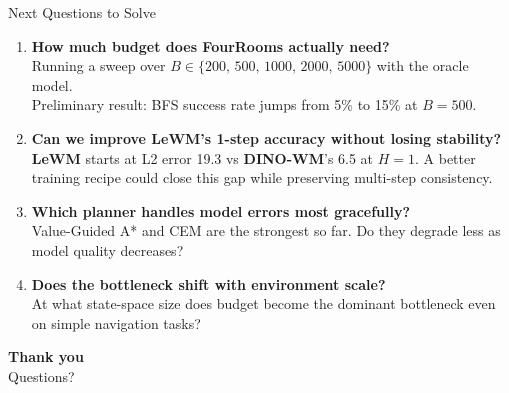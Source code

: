 \documentclass[aspectratio=169, 11pt]{beamer}
\newcommand{\lewm}{\textcolor{LeWMc}{\textbf{LeWM}}\xspace}
\newcommand{\dino}{\textcolor{DINOc}{\textbf{DINO-WM}}\xspace}
\begin{document}
\begin{frame}{Next Questions to Solve}

  \begin{enumerate}
    \setlength\itemsep{1.1em}

    \item \textbf{How much budget does FourRooms actually need?}\\
    {\small Running a sweep over $B \in \{200,\, 500,\, 1000,\, 2000,\, 5000\}$ with the oracle model.\\
    Preliminary result: BFS success rate jumps from 5\% to 15\% at $B = 500$.}

    \item \textbf{Can we improve \lewm's 1-step accuracy without losing stability?}\\
    {\small \lewm starts at L2 error 19.3 vs \dino's 6.5 at $H=1$. A better training recipe could close this gap while preserving multi-step consistency.}

    \item \textbf{Which planner handles model errors most gracefully?}\\
    {\small Value-Guided A* and CEM are the strongest so far. Do they degrade less as model quality decreases?}

    \item \textbf{Does the bottleneck shift with environment scale?}\\
    {\small At what state-space size does budget become the dominant bottleneck even on simple navigation tasks?}

  \end{enumerate}

\end{frame}

{
\begin{frame}[plain]
  \begin{center}
    \vspace{3em}
    {\Large\bfseries\color{Dark} Thank you}\\[1.5em]
    {\color{Mid} Questions?}
  \end{center}
\end{frame}
}
\end{document}
